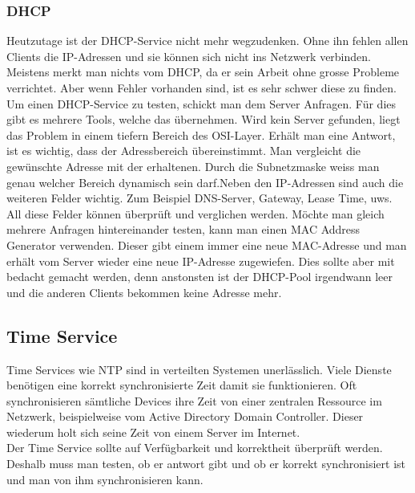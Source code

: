 \documentclass[a4,12pt]{scrartcl}
\begin{document}
\subsubsection{DHCP}
Heutzutage ist der DHCP-Service nicht mehr wegzudenken. Ohne ihn fehlen allen Clients die IP-Adressen und sie können sich nicht ins Netzwerk verbinden. Meistens merkt man nichts vom DHCP, da er sein Arbeit ohne grosse Probleme verrichtet. Aber wenn Fehler vorhanden sind, ist es sehr schwer diese zu finden. \newline\newline
Um einen DHCP-Service zu testen, schickt man dem Server Anfragen. Für dies gibt es mehrere Tools, welche das übernehmen. Wird kein Server gefunden, liegt das Problem in einem tiefern Bereich des OSI-Layer.\newline
Erhält man eine Antwort, ist es wichtig, dass der Adressbereich übereinstimmt. Man vergleicht die gewünschte Adresse mit der erhaltenen. Durch die Subnetzmaske weiss man genau welcher Bereich dynamisch sein darf.\newline\newline Neben den IP-Adressen sind auch die weiteren Felder wichtig. Zum Beispiel DNS-Server, Gateway, Lease Time, uws. All diese Felder können überprüft und verglichen werden.\newline\newline
Möchte man gleich mehrere Anfragen hintereinander testen, kann man einen MAC Address Generator verwenden. Dieser gibt einem immer eine neue MAC-Adresse und man erhält vom Server wieder eine neue IP-Adresse zugewiefen. Dies sollte aber mit bedacht gemacht werden, denn anstonsten ist der DHCP-Pool irgendwann leer und die anderen Clients bekommen keine Adresse mehr. 
\subsection{Time Service}
Time Services wie NTP sind in verteilten Systemen unerlässlich. Viele Dienste benötigen eine korrekt synchronisierte Zeit damit sie funktionieren. Oft synchronisieren sämtliche Devices ihre Zeit von einer zentralen Ressource im Netzwerk, beispielweise vom Active Directory Domain Controller. Dieser wiederum holt sich seine Zeit von einem Server im Internet.\\

\noindent Der Time Service sollte auf Verfügbarkeit und korrektheit überprüft werden. Deshalb muss man testen, ob er antwort gibt und ob er korrekt synchronisiert ist und man von ihm synchronisieren kann.
\end{document}
